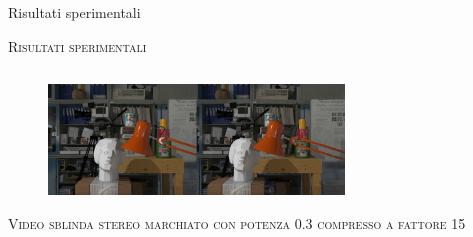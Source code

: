 \documentclass{beamer}
\begin{document}
\begin{section}{Risultati sperimentali}
\begin{frame}[t]{\textsc{Risultati sperimentali}}
\begin{columns}
\begin{column}{5cm}
\end{column}
\end{columns}
\vspace{2mm}
\begin{figure}
  \includegraphics[width=0.7\textwidth]{./img_wat/marked_03_DFT.jpg}  
  \caption{} 
  \label{fig:mg1}
\end{figure}
\end{frame}



\begin{frame}[t]{\textsc{Video sblinda stereo marchiato con potenza 0.3 compresso a fattore 15
}}
\vspace{2mm}
\begin{center}
\end{center}

\end{frame}
\end{section}
\end{document}
